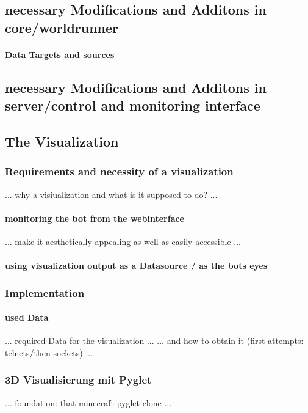 \subsection{necessary Modifications and Additons in core/worldrunner}

\paragraph{Data Targets and sources}

\subsection{necessary Modifications and Additons in server/control and monitoring interface}

\subsection{The Visualization}

\subsubsection{Requirements and necessity of a visualization}
... why a visiualization and what is it supposed to do? ...

\paragraph{monitoring the bot from the webinterface}
... make it aesthetically appealing as well as easily accessible ...

\paragraph{using visualization output as a Datasource / as the bots eyes}

\subsubsection{Implementation}

\paragraph{used Data}
... required Data for the visualization ...
... and how to obtain it (first attempts: telnets/then sockets) ...

\subsubsection{3D Visualisierung mit Pyglet}
... foundation: that minecraft pyglet clone ...

